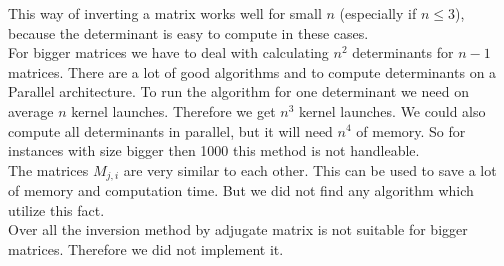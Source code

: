 This way of inverting a matrix works well for small $n$ (especially if $n \leq 3$), because the determinant is easy to compute in these cases.\\

For bigger matrices we have to deal with calculating $n^2$ determinants for $n-1$ matrices. There are a lot of good algorithms \cite{Dodgson1866} and \cite{ABDELMALEK2007} to compute determinants on a Parallel architecture. To run the algorithm for one determinant we need on average $n$ kernel launches. Therefore we get $n^3$ kernel launches. We could also compute all determinants in parallel, but it will need $n^4$ of memory. So for instances with size bigger then 1000 this method is not handleable. \\

The matrices $M_{j,i}$ are very similar to each other. This can be used to save a lot of memory and computation time. But we did not find any algorithm which utilize this fact.\\

Over all the inversion method by adjugate matrix is not suitable for bigger matrices.  Therefore we did not implement it.

